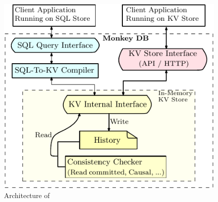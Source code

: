 \begin{figure}
\centering
\includegraphics[scale=0.8]{Sources/sql/figures/block_dia.pdf}
\caption{Architecture of \tool{}}
\label{fig:block_dia}
\end{figure}




